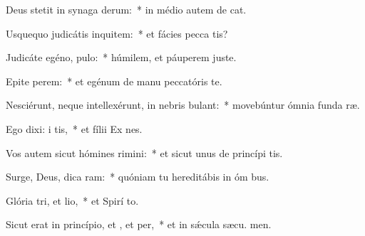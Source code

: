 \item Deus stetit in synaga derum:~* in médio autem de cat.
\item Usquequo judicátis inquitem:~* et fácies pecca tis?
\item Judicáte egéno,  pulo:~* húmilem, et páuperem juste.
\item Epite perem:~* et egénum de manu peccatóris te.
\item Nesciérunt, neque intellexérunt, in nebris bulant:~* movebúntur ómnia funda ræ.
\item Ego dixi: i tis,~* et fílii Ex nes.
\item Vos autem sicut hómines rimini:~* et sicut unus de princípi tis.
\item Surge, Deus, dica ram:~* quóniam tu hereditábis in óm bus.
\item Glória tri, et lio,~* et Spirí to.
\item Sicut erat in princípio, et , et per,~* et in sǽcula sæcu. men.

